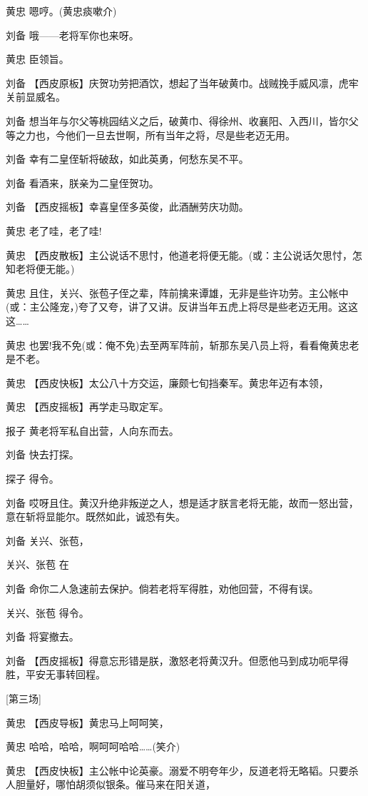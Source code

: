 黄忠 嗯哼。(黄忠痰嗽介)

刘备 哦------老将军你也来呀。

黄忠 臣领旨。

刘备
【西皮原板】庆贺功劳把酒饮，想起了当年破黄巾。战贼挽手威风凛，虎牢关前显威名。

刘备
想当年与尔父等桃园结义之后，破黄巾、得徐州、收襄阳、入西川，皆尔父等之力也，今他们一旦去世啊，所有当年之将，尽是些老迈无用。

刘备 幸有二皇侄斩将破敌，如此英勇，何愁东吴不平。

刘备 看酒来，朕亲为二皇侄贺功。

刘备 【西皮摇板】幸喜皇侄多英俊，此酒酬劳庆功勋。

黄忠 老了哇，老了哇!

黄忠
【西皮散板】主公说话不思忖，他道老将便无能。(或：主公说话欠思忖，怎知老将便无能。)

黄忠
且住，关兴、张苞子侄之辈，阵前擒来谭雄，无非是些许功劳。主公帐中(或：主公隆宠，)夸了又夸，讲了又讲。反讲当年五虎上将尽是些老迈无用。这这这\ldots{}\ldots{}

黄忠
也罢!我不免(或：俺不免)去至两军阵前，斩那东吴八员上将，看看俺黄忠老是不老。

黄忠 【西皮快板】太公八十方交运，廉颇七旬挡秦军。黄忠年迈有本领，

黄忠 【西皮摇板】再学走马取定军。

报子 黄老将军私自出营，人向东而去。

刘备 快去打探。

探子 得令。

刘备
哎呀且住。黄汉升绝非叛逆之人，想是适才朕言老将无能，故而一怒出营，意在斩将显能尔。既然如此，诚恐有失。

刘备 关兴、张苞，

关兴、张苞 在

刘备 命你二人急速前去保护。倘若老将军得胜，劝他回营，不得有误。

关兴、张苞 得令。

刘备 将宴撤去。

刘备
【西皮摇板】得意忘形错是朕，激怒老将黄汉升。但愿他马到成功呃早得胜，平安无事转回程。

{[}第三场{]}

黄忠 【西皮导板】黄忠马上呵呵笑，

黄忠 哈哈，哈哈，啊呵呵哈哈\ldots{}\ldots{}(笑介)

黄忠
【西皮快板】主公帐中论英豪。溺爱不明夸年少，反道老将无略韬。只要杀人胆量好，哪怕胡须似银条。催马来在阳关道，

